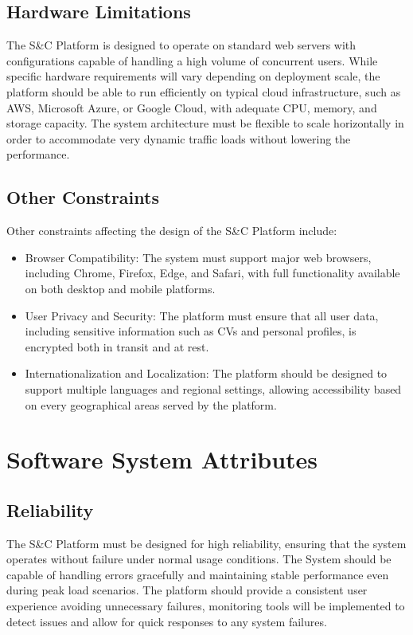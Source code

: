 \subsection{Hardware Limitations}
The S\&C Platform is designed to operate on standard
 web servers with configurations capable of handling a high volume of concurrent users. 
 While specific hardware requirements will vary depending on deployment scale, 
 the platform should be able to run efficiently on typical cloud infrastructure, 
 such as AWS, Microsoft Azure, or Google Cloud, with adequate CPU, memory, and storage capacity. 
 The system architecture must be flexible to scale horizontally in order to accommodate very dynamic traffic loads without lowering the performance.

\subsection{Other Constraints}
Other constraints affecting the design of the S\&C Platform include:
\begin {itemize}
\item Browser Compatibility: The system must support major web browsers, 
including Chrome, Firefox, Edge, and Safari, with full functionality 
available on both desktop and mobile platforms.
  
\item User Privacy and Security: The platform must ensure that all user data, 
including sensitive information such as CVs and personal profiles, 
is encrypted both in transit and at rest.
  
\item Internationalization and Localization: The platform should be designed 
to support multiple languages and regional settings, allowing accessibility
based on every geographical areas served by the platform.
\end {itemize}
\section{Software System Attributes}

\subsection{Reliability}
The S\&C Platform must be designed for high reliability, 
ensuring that the system operates without failure under normal usage conditions. 
The System should be capable of handling errors gracefully and maintaining stable performance even during peak load scenarios. 
The platform should provide a consistent user experience avoiding unnecessary failures, 
monitoring tools will be implemented to detect issues and allow for quick responses to any system failures.

